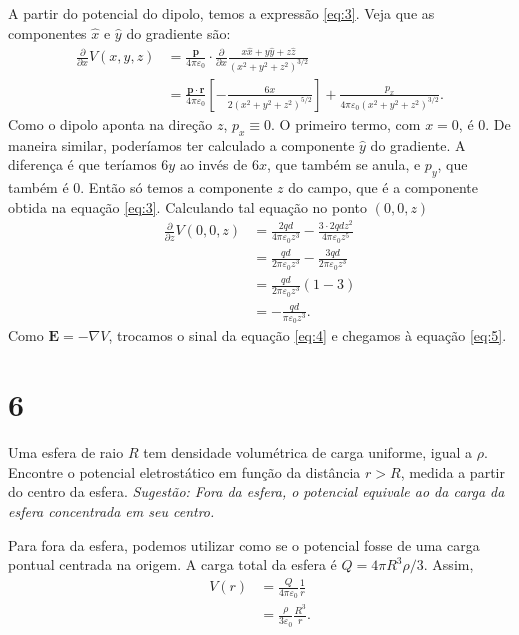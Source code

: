 \documentclass[11pt]{article}
\begin{document}
A partir do potencial do dipolo, temos a expressão \ref{eq:3}. Veja que as
componentes \(\hat{x}\) e \(\hat{y}\) do gradiente são:
\begin{align}
  \frac{\partial}{\partial x}V(x,y,z) &= \frac{\mathbf p}{4\pi\varepsilon_0}\cdot\frac{\partial}{\partial
                          x}\frac{x\hat x+y\hat y+z\hat z} {(x^2+y^2+z^2)^{3/2}}  \\
                        &=\frac{\mathbf p\cdot \mathbf r}{4\pi\varepsilon_0}
                          \left[-\frac{6x}{2(x^2+y^2+z^2)^{5/2}}\right]
                          + \frac{p_x}{4\pi\varepsilon_0(x^2+y^2+z^2)^{3/2}}.
\end{align}
Como o dipolo aponta na direção \(z\), \(p_x \equiv 0\). O primeiro termo,
com \(x=0\), é \(0\). De maneira similar, poderíamos ter calculado a
componente \(\hat y\) do gradiente. A diferença é que teríamos \(6y\) ao
invés de \(6x\), que também se anula, e \(p_y\), que também é \(0\). Então só
temos a componente \(z\) do campo, que é a componente obtida na equação \ref{eq:3}.
Calculando tal equação no ponto \((0,0,z)\)
\begin{align}
  \frac{\partial}{\partial z}V(0,0,z) &= \frac{2qd}{4\pi\varepsilon_0 z^3}-\frac{3\cdot2qdz^2}{4\pi\varepsilon_0z^5}\\
                        &= \frac{qd}{2\pi\varepsilon_0 z^3}-\frac{3qd}{2\pi\varepsilon_0z^3}\\
                        &= \frac{qd}{2\pi\varepsilon_0 z^3}(1-3)\\
                        &= -\frac{qd}{\pi\varepsilon_0 z^3}.\label{eq:4}
\end{align}
Como \(\mathbf E=-\nabla V\), trocamos o sinal da equação \ref{eq:4} e chegamos à
equação \ref{eq:5}.
\section{6}
\label{sec:orgae1f32e}
Uma esfera de raio \(R\) tem densidade volumétrica de carga uniforme,
igual a \(\rho\). Encontre o potencial eletrostático em função da distância
\(r>R\), medida a partir do centro da esfera. \emph{Sugestão: Fora da esfera, o}
\emph{potencial equivale ao da carga da esfera concentrada em seu centro.}

Para fora da esfera, podemos utilizar como se o potencial fosse de uma
carga pontual centrada na origem. A carga total da esfera é \(Q = 4\pi R^3
\rho/3\). Assim,
\begin{align}
  V(r) &= \frac{Q}{4\pi\varepsilon_0}\frac{1}{r}\\
       &= \frac{\rho}{3\varepsilon_0}\frac{R^3}{r}.
\end{align}
\end{document}
